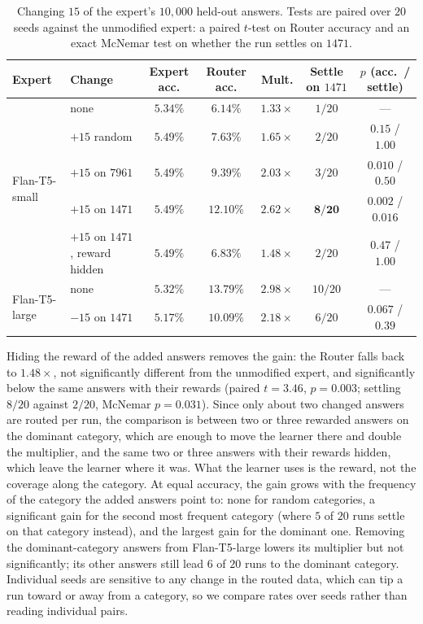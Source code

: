 \documentclass{article}
\theoremstyle{definition}
\theoremstyle{remark}
\theoremstyle{remark}
\begin{document}
\begin{table}[h]
\centering
\caption{Changing $15$ of the expert's $10{,}000$ held-out answers. Tests are
paired over $20$ seeds against the unmodified expert: a paired $t$-test on
Router accuracy and an exact McNemar test on whether the run settles on
$1471$.}
\label{tab:inject}
\small
\setlength{\tabcolsep}{4pt}
\begin{tabular}{@{}llccccc@{}}
\toprule
Expert & Change & Expert acc. & Router acc. & Mult. & Settle on $1471$ & $p$ (acc.\ / settle) \\
\midrule
\multirow{5}{*}{Flan-T5-small} & none & $5.34\%$ & $6.14\%$ & $1.33\times$ & $1/20$ & --- \\
& $+15$ random & $5.49\%$ & $7.63\%$ & $1.65\times$ & $2/20$ & $0.15$ / $1.00$ \\
& $+15$ on $7961$ & $5.49\%$ & $9.39\%$ & $2.03\times$ & $3/20$ & $0.010$ / $0.50$ \\
& $+15$ on $1471$ & $5.49\%$ & $\mathbf{12.10\%}$ & $\mathbf{2.62\times}$ & $\mathbf{8/20}$ & $\mathbf{0.002}$ / $\mathbf{0.016}$ \\
& $+15$ on $1471$, reward hidden & $5.49\%$ & $6.83\%$ & $1.48\times$ & $2/20$ & $0.47$ / $1.00$ \\
\midrule
\multirow{2}{*}{Flan-T5-large} & none & $5.32\%$ & $13.79\%$ & $2.98\times$ & $10/20$ & --- \\
& $-15$ on $1471$ & $5.17\%$ & $10.09\%$ & $2.18\times$ & $6/20$ & $0.067$ / $0.39$ \\
\bottomrule
\end{tabular}
\end{table}

Hiding the reward of the added answers removes the gain: the Router falls
back to $1.48\times$, not significantly different from the unmodified expert,
and significantly below the same answers with their rewards (paired $t=3.46$,
$p=0.003$; settling $8/20$ against $2/20$, McNemar $p=0.031$). Since only
about two changed answers are routed per run, the comparison is between two
or three rewarded answers on the dominant category, which are enough to move
the learner there and double the multiplier, and the same two or three
answers with their rewards hidden, which leave the learner where it was. What
the learner uses is the reward, not the coverage along the category. At equal
accuracy, the gain grows with the frequency of the category the
added answers point to: none for random categories, a significant gain for
the second most frequent category (where $5$ of $20$ runs settle on that
category instead), and the largest gain for the dominant one. Removing the
dominant-category answers from Flan-T5-large lowers its multiplier but not
significantly; its other answers still lead $6$ of $20$ runs to the
dominant category. Individual seeds are sensitive to any change in the
routed data, which can tip a run toward or away from a category, so we
compare rates over seeds rather than reading individual pairs.
\end{document}

